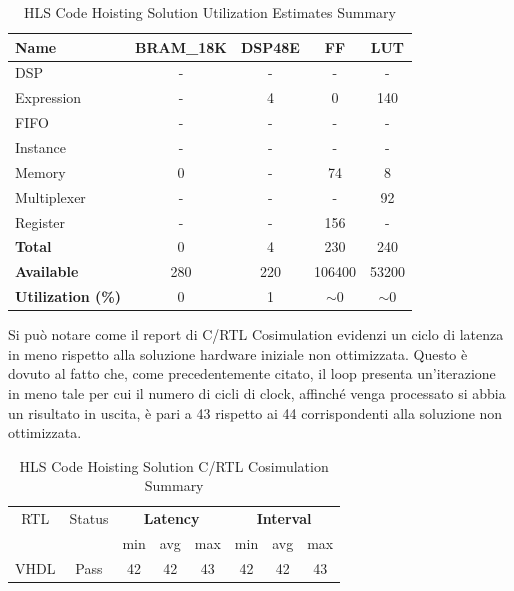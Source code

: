 \begin{table}[h]
    \centering
    \begin{tabular}{|l|c|c|c|c|}
        \hline
        \textbf{Name}    & \textbf{BRAM\_18K} & \textbf{DSP48E} & \textbf{FF} & \textbf{LUT} \\ \hline
        DSP              & -                   & -               & -           & -            \\ 
        Expression       & -                   & 4               & 0           & 140          \\ 
        FIFO             & -                   & -               & -           & -            \\ 
        Instance         & -                   & -               & -           & -            \\ 
        Memory           & 0                   & -               & 74          & 8            \\ 
        Multiplexer      & -                   & -               & -           & 92          \\ 
        Register         & -                   & -               & 156         & -            \\ \hline
        \textbf{Total}   & 0                   & 4               & 230         & 240          \\ \hline
        \textbf{Available} & 280               & 220             & 106400      & 53200        \\ \hline
        \textbf{Utilization (\%)} & 0            & 1               & $\sim$0     & $\sim$0      \\ \hline
    \end{tabular}
    \caption{HLS Code Hoisting Solution Utilization Estimates Summary}
    \label{tab:hls-code-hoisting-solution-utilization-estimates-summary}
\end{table}

Si può notare come il report di C/RTL Cosimulation evidenzi un ciclo di latenza in meno rispetto alla soluzione hardware iniziale non ottimizzata. Questo è dovuto al fatto che, come precedentemente citato, il loop presenta un'iterazione in meno tale per cui il numero di cicli di clock, affinché venga processato si abbia un risultato in uscita, è pari a 43 rispetto ai 44 corrispondenti alla soluzione non ottimizzata.

\begin{table}[H]
    \centering
    \begin{tabular}{|c|c|c|c|c|c|c|c|}
        \hline
        \multicolumn{1}{|c|}{RTL} & \multicolumn{1}{|c|}{Status} & \multicolumn{3}{c|}{\textbf{Latency}} & \multicolumn{3}{c|}{\textbf{Interval}} \\
        &  & min & avg & max & min & avg & max \\
        \hline
        VHDL & Pass & 42 & 42 & 43 & 42 & 42 & 43 \\
        \hline
    \end{tabular}
    \caption{HLS Code Hoisting Solution C/RTL Cosimulation Summary }
    \label{tab:hls-code-hoisting-solution-cosimulation-summary}
\end{table}

